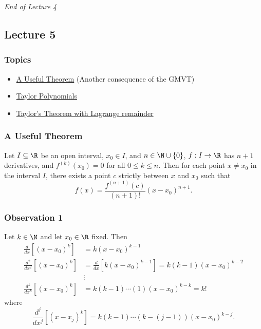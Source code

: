 \begin{center}
    \textit{End of Lecture 4} 
\end{center}

\subsection{Lecture 5}

\subsubsection{Topics}

\begin{itemize}
    \item {\hyperref[A Useful Theorem]{A Useful Theorem}} (Another consequence of the GMVT)
    \item {\hyperref[Taylor Polynomials]{Taylor Polynomials}}
    \item {\hyperref[Taylor's Theorem with Lagrange remainder]{Taylor's Theorem with Lagrange remainder}}  
\end{itemize}

\subsubsection{A Useful Theorem}\label{A Useful Theorem}


\begin{corollary}
    Let \( I \subseteq  \R   \) be an open interval, \( {x}_{0} \in I  \), and \( n \in \N \cup \{ 0 \}  \), \( f: I \to \R  \) has \( n + 1  \) derivatives, and \( f^{(k)}({x}_{0}) = 0  \) for all \( 0 \leq k \leq n  \). Then for each point \( x \neq {x}_{0} \) in the interval \( I  \), there exists a point \( c  \) strictly between \( x  \) and \( {x}_{0} \) such that 
    \[  f(x) = \frac{ f^{(n+1)}(c) }{ (n+1)! } (x-{x}_{0})^{n+1}. \]
\end{corollary}

\subsubsection{Observation 1}

Let \( k \in \N  \) and let \( {x}_{0} \in \R  \) fixed. Then
\begin{align*}
    \frac{ d }{ dx } [(x - {x}_{0})^{k}] &= k (x - {x}_{0})^{k-1} \\
    \frac{ d^{2} }{ d x^{2} } [(x- {x}_{0})^{k}] &= \frac{ d  }{  d x  }  [ k (x - {x}_{0})^{k-1}] = k (k - 1) (x - {x}_{0})^{k - 2} \\
                                                 &\vdots \\
    \frac{ d^{k }  }{  d x^{k } }  [(x - {x}_{0})^{k}] &= k (k -1)\cdots (1) (x - {x}_{0})^{k - k} = k!
\end{align*}
where 
\[  \frac{ d^{j} }{  d x^{j } }  [(x - {x}_{j})^{k}] = k (k - 1) \cdots ( k - (j -1)) (x - {x}_{0})^{k - j}.   \]

